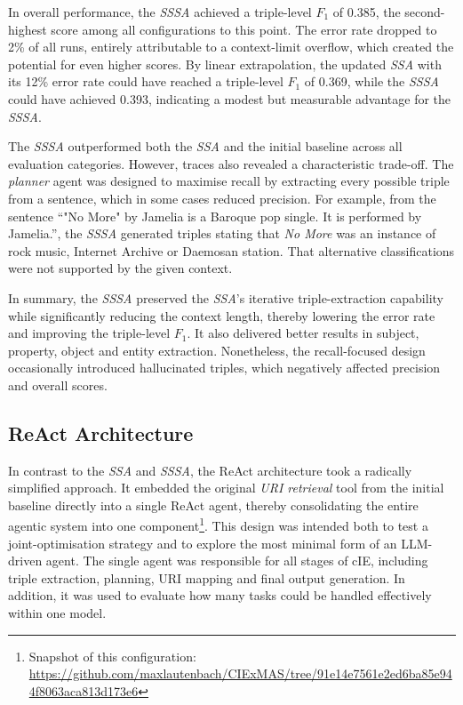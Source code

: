 \documentclass[a4paper,oneside,bibliography=totoc]{scrbook}
\begin{document}
In overall performance, the \textit{\ac{SSSA}} achieved a triple-level $F_{1}$ of 0.385, the second-highest score among all configurations to this point. The error rate dropped to 2\% of all runs, entirely attributable to a context-limit overflow, which created the potential for even higher scores. By linear extrapolation, the updated \textit{\ac{SSA}} with its 12\% error rate could have reached a triple-level $F_{1}$ of 0.369, while the \textit{\ac{SSSA}} could have achieved 0.393, indicating a modest but measurable advantage for the \textit{\ac{SSSA}}.

The \textit{\ac{SSSA}} outperformed both the \textit{\ac{SSA}} and the initial baseline across all evaluation categories. However, traces also revealed a characteristic trade-off. The \textit{planner} agent was designed to maximise recall by extracting every possible triple from a sentence, which in some cases reduced precision. For example, from the sentence \enquote{"No More" by Jamelia is a Baroque pop single. It is performed by Jamelia.}, the \textit{\ac{SSSA}} generated triples stating that \textit{No More} was an instance of rock music, Internet Archive or Daemosan station. That alternative classifications were not supported by the given context.

In summary, the \textit{\ac{SSSA}} preserved the \textit{\ac{SSA}}’s iterative triple-extraction capability while significantly reducing the context length, thereby lowering the error rate and improving the triple-level $F_{1}$. It also delivered better results in subject, property, object and entity extraction. Nonetheless, the recall-focused design occasionally introduced hallucinated triples, which negatively affected precision and overall scores.

\subsection{ReAct Architecture}
\label{subsec:one_agent_architecture_tool_usage}

In contrast to the \textit{\ac{SSA}} and \textit{\ac{SSSA}}, the ReAct architecture took a radically simplified approach. It embedded the original \textit{\ac{URI} retrieval} tool from the initial baseline directly into a single ReAct agent, thereby consolidating the entire agentic system into one component\footnote{Snapshot of this configuration: \url{https://github.com/maxlautenbach/CIExMAS/tree/91e14e7561e2ed6ba85e944f8063aca813d173e6}}. This design was intended both to test a joint-optimisation strategy and to explore the most minimal form of an \ac{LLM}-driven agent. The single agent was responsible for all stages of \ac{cIE}, including triple extraction, planning, \ac{URI} mapping and final output generation. In addition, it was used to evaluate how many tasks could be handled effectively within one model.
\end{document}
